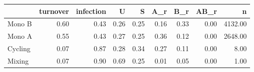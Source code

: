 \begin{tabular}{lrrrrrrrr}
\toprule
 & turnover & infection & U & S & A\_r & B\_r & AB\_r & n \\
\midrule
Mono B & 0.60 & 0.43 & 0.26 & 0.25 & 0.16 & 0.33 & 0.00 & 4132.00 \\
Mono A & 0.55 & 0.43 & 0.27 & 0.25 & 0.36 & 0.12 & 0.00 & 2648.00 \\
Cycling & 0.07 & 0.87 & 0.28 & 0.34 & 0.27 & 0.11 & 0.00 & 8.00 \\
Mixing & 0.07 & 0.90 & 0.69 & 0.25 & 0.01 & 0.05 & 0.00 & 1.00 \\
\bottomrule
\end{tabular}
